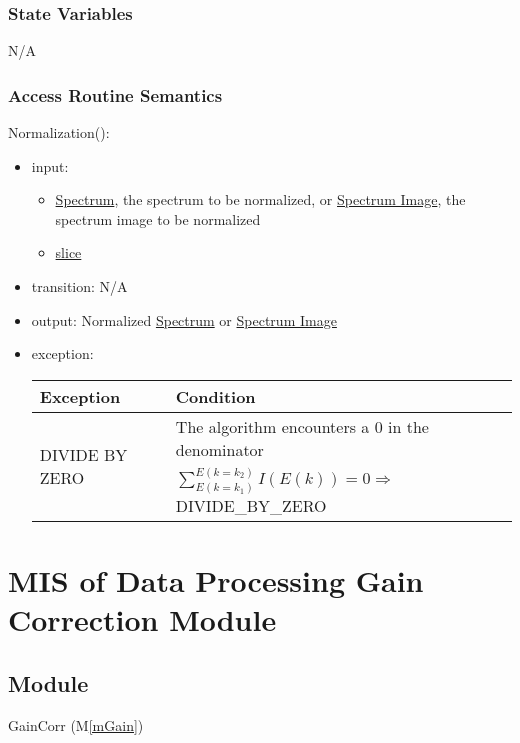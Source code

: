 \documentclass[12pt, titlepage]{article}
\newcommand{\mref}[1]{M\ref{#1}}
\begin{document}
\subsubsection{State Variables}
N/A

\subsubsection{Access Routine Semantics}

\noindent Normalization():
\begin{itemize}
    \item input: 
    \begin{itemize}
        \item \hyperref[Mod:Spectrum]{Spectrum}, the spectrum to be normalized,
        or \hyperref[Mod:SI]{Spectrum Image}, the spectrum image to be normalized
        \item \hyperref[Mod:Slice1D]{slice}
    \end{itemize}
    \item transition: N/A
    \item output: Normalized \hyperref[Mod:Spectrum]{Spectrum} or
    \hyperref[Mod:SI]{Spectrum Image}
    \item exception:
    \begin{center}
        \begin{tabular}{p{3.5cm} p{12cm}}
            \toprule[0.15em]
            \textbf{Exception} & \textbf{Condition}\\
            \midrule[0.1em]
            \multirow{2}{0.25\textwidth}{DIVIDE BY ZERO} & The algorithm
            encounters a 0 in the denominator\\ 
            & $\sum_{E(k=k_1)}^{E(k=k_2)}{I(E(k))} = 0 \Rightarrow$
            DIVIDE\_BY\_ZERO\\ 
            \bottomrule[0.15em]
        \end{tabular}
    \end{center}
\end{itemize}

\section{MIS of Data Processing Gain Correction Module} \label{Mod:GainCorr}

\subsection{Module}
GainCorr (\mref{mGain})
\end{document}
